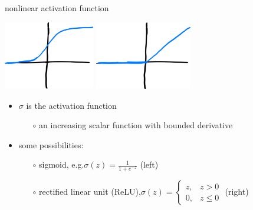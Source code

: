 \documentclass[xcolor={svgnames},
               hyperref={colorlinks,citecolor=DeepPink4,linkcolor=FireBrick,urlcolor=Maroon}]
               {beamer}
\begin{document}
\begin{frame}{nonlinear activation function}

\begin{center}
\includegraphics[height=30mm]{figs/sigmoid} \hspace{10mm} \includegraphics[height=30mm]{figs/relu}
\end{center}

\begin{itemize}
\item $\sigma$ is the \alert{activation function}
    \begin{itemize}
    \item[$\circ$] an increasing scalar function with bounded derivative
    \end{itemize}
\item some possibilities:
    \begin{itemize}
    \item[$\circ$] \alert{sigmoid}, e.g.\qquad $\displaystyle \sigma(z) = \frac{1}{1 + e^{-z}}$ \quad (left)
    \item[$\circ$] \alert{rectified linear unit (ReLU)},\qquad $\displaystyle \sigma(z) = \begin{cases} z, & z > 0 \\ 0, & z \le 0 \end{cases}$ \quad (right)
    \end{itemize}
\end{itemize}
\end{frame}
\end{document}
